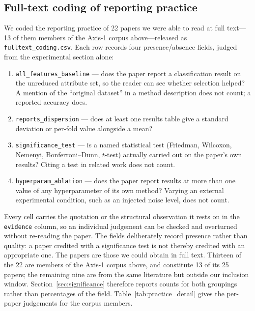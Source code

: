 \subsection*{Full-text coding of reporting practice}
\label{app:coding}
We coded the reporting practice of 22 papers we were able to read at full
text---13 of them members of the Axis-1 corpus above---released as
\texttt{fulltext\_coding.csv}.  Each row records four presence/absence
fields, judged from the experimental section alone:
\begin{enumerate}[leftmargin=*,itemsep=1pt]
  \item \texttt{all\_features\_baseline} --- does the paper report a
        classification result on the unreduced attribute set, so the reader
        can see whether selection helped?  A mention of the ``original
        dataset'' in a method description does not count; a reported accuracy
        does.
  \item \texttt{reports\_dispersion} --- does at least one results table give
        a standard deviation or per-fold value alongside a mean?
  \item \texttt{significance\_test} --- is a named statistical test
        (Friedman, Wilcoxon, Nemenyi, Bonferroni--Dunn, $t$-test) actually
        carried out on the paper's own results?  Citing a test in related
        work does not count.
  \item \texttt{hyperparam\_ablation} --- does the paper report results at
        more than one value of any hyperparameter of its own method?  Varying
        an external experimental condition, such as an injected noise level,
        does not count.
\end{enumerate}
Every cell carries the quotation or the structural observation it rests on in
the \texttt{evidence} column, so an individual judgement can be checked and
overturned without re-reading the paper.  The fields deliberately record
presence rather than quality: a paper credited with a significance test is
not thereby credited with an appropriate one.  The papers are those we could obtain in full text.
Thirteen of the 22 are members of the Axis-1 corpus above, and constitute 13
of its 25 papers; the remaining nine are from the same literature but outside
our inclusion window.  Section~\ref{sec:significance} therefore reports counts
for both groupings rather than percentages of the field.
Table~\ref{tab:practice_detail} gives the per-paper judgements for the corpus
members.


